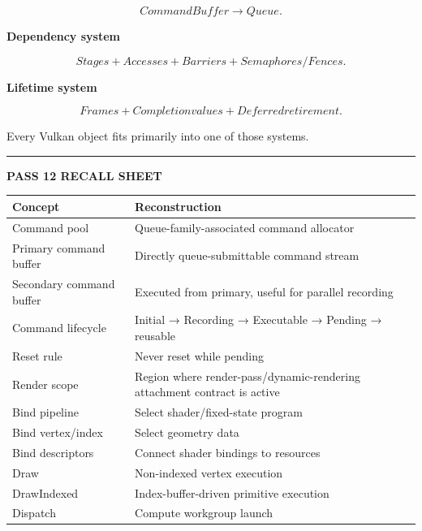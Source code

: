 \[
CommandBuffer
\rightarrow
Queue.
\]

\textbf{Dependency system}

\[
Stages
+
Accesses
+
Barriers
+
Semaphores/Fences.
\]

\textbf{Lifetime system}

\[
Frames
+
Completion values
+
Deferred retirement.
\]

Every Vulkan object fits primarily into one of those systems.

\begin{center}\rule{0.5\linewidth}{0.5pt}\end{center}

\textbf{PASS 12 RECALL SHEET}

{\def\LTcaptype{none} %
\begin{longtable}[]{@{}
  >{\raggedright\arraybackslash}p{}
  >{\raggedright\arraybackslash}p{}@{}}
\toprule\noalign{}
\begin{minipage}[b]{\linewidth}\raggedright
Concept
\end{minipage} & \begin{minipage}[b]{\linewidth}\raggedright
Reconstruction
\end{minipage} \\
\midrule\noalign{}
\endhead
\bottomrule\noalign{}
\endlastfoot
Command pool & Queue-family-associated command allocator \\
Primary command buffer & Directly queue-submittable command stream \\
Secondary command buffer & Executed from primary, useful for parallel recording \\
Command lifecycle & Initial → Recording → Executable → Pending → reusable \\
Reset rule & Never reset while pending \\
Render scope & Region where render-pass/dynamic-rendering attachment contract is active \\
Bind pipeline & Select shader/fixed-state program \\
Bind vertex/index & Select geometry data \\
Bind descriptors & Connect shader bindings to resources \\
Draw & Non-indexed vertex execution \\
DrawIndexed & Index-buffer-driven primitive execution \\
Dispatch & Compute workgroup launch \\

\end{longtable}}

